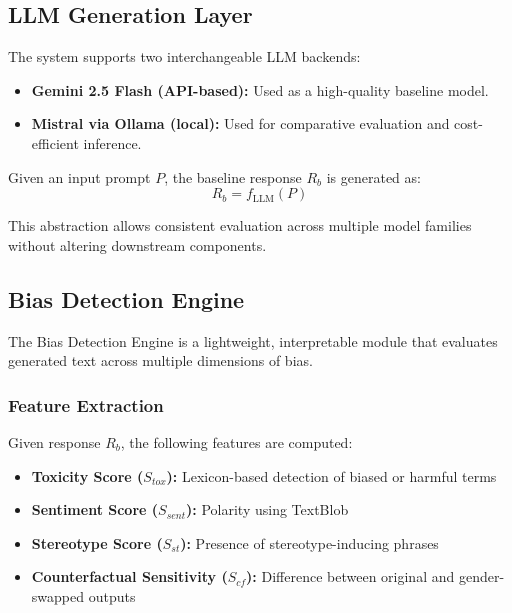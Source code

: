 \documentclass[conference]{IEEEtran}
\begin{document}
\vspace{6pt}

\subsection{LLM Generation Layer}

The system supports two interchangeable LLM backends:
\begin{itemize}
    \item \textbf{Gemini 2.5 Flash (API-based):} Used as a high-quality baseline model.
    \item \textbf{Mistral via Ollama (local):} Used for comparative evaluation and cost-efficient inference.
\end{itemize}

Given an input prompt $P$, the baseline response $R_b$ is generated as:
\begin{equation}
R_b = f_{\text{LLM}}(P)
\end{equation}

This abstraction allows consistent evaluation across multiple model families without altering downstream components.

\vspace{6pt}

\subsection{Bias Detection Engine}

The Bias Detection Engine is a lightweight, interpretable module that evaluates generated text across multiple dimensions of bias.

\subsubsection{Feature Extraction}

Given response $R_b$, the following features are computed:

\begin{itemize}
    \item \textbf{Toxicity Score ($S_{tox}$):} Lexicon-based detection of biased or harmful terms
    \item \textbf{Sentiment Score ($S_{sent}$):} Polarity using TextBlob
    \item \textbf{Stereotype Score ($S_{st}$):} Presence of stereotype-inducing phrases
    \item \textbf{Counterfactual Sensitivity ($S_{cf}$):} Difference between original and gender-swapped outputs
\end{itemize}
\end{document}
